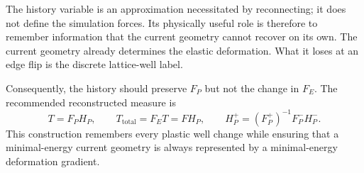 \documentclass[9pt,a4paper]{extarticle}
\newcommand{\Pm}{F_P^-}
\newcommand{\Pp}{F_P^+}
\newcommand{\Hp}{H_P}
\newcommand{\Ttot}{T_{\mathrm{total}}}
\begin{document}
The history variable is an approximation necessitated by reconnecting; it does
not define the simulation forces.  Its physically useful role is therefore to
remember information that the current geometry cannot recover on its own.  The
current geometry already determines the elastic deformation.  What it loses at
an edge flip is the discrete lattice-well label.

Consequently, the history should preserve $F_P$ but not the change in $F_E$.
The recommended reconstructed measure is
\begin{equation}
\boxed{
T=F_P\Hp,
\qquad
\Ttot=F_E T=F\Hp,
\qquad
\Hp^+=(\Pp)^{-1}\Pm\Hp^- .}
\end{equation}
This construction remembers every plastic well change while ensuring that a
minimal-energy current geometry is always represented by a minimal-energy
deformation gradient.
\end{document}
